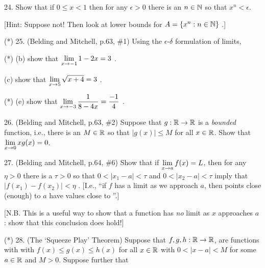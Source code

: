 \documentclass[12pt]{article}
\begin{document}
\begin{description}


\item{24.} Show that if $0\leq x<1$ then for any $\epsilon>0$ there is an $n\in{\mathbb N}$ so that $x^n<\epsilon$. 

\ssk

\item{\spc} [Hint: Suppose not! Then look at lower bounds for $A=\{x^n : n\in{\mathbb N}\}$ .] 

\msk

\item{(*) 25.} (Belding and Mitchell, p.63, \#1) Using the $\epsilon$-$\delta$ formulation of limits,

\item{(*)} (b) show that $\displaystyle\lim_{x\rightarrow -1} 1-2x = 3$ .

\item{\spc} (c) show that $\displaystyle \lim_{x\rightarrow 5} \sqrt{x+4} = 3$ .

\item{(*)} (e) show that $\displaystyle \lim_{x\rightarrow -3} {{1}\over{8-4x}} = {{-1}\over{4}}$ .

\msk

\item{26.} (Belding and Mitchell, p.63, \#2) Suppose that $g:{\mathbb R}\rightarrow{\mathbb R}$ is a {\it bounded}
function, i.e., there is an $M\in{\mathbb R}$ so that $|g(x)|\leq M$ for all $x\in{\mathbb R}$. Show 
that $\displaystyle\lim_{x\rightarrow 0} xg(x) = 0$.

\msk

\item{27.} (Belding and Mitchell, p.64, \#6) Show that if $\displaystyle\lim_{x\rightarrow a} f(x) = L$, then 
for any $\eta>0$ there is a $\tau>0$ so that $0<|x_1-a|<\tau$ and $0<|x_2-a|<\tau$ imply that
$|f(x_1)-f(x_2)|<\eta$ . [I.e., ``if $f$ has a limit as we approach $a$, then points close (enough)
to $a$ have values close to  ''.]

\ssk

\item{\spc} [N.B. This is a useful way to show that a function has {\it no} limit as $x$ approaches $a$ : 
show that this conclusion does  hold!]

\msk

\item{(*) 28.} (The `Squeeze Play' Theorem) Suppose that $f,g,h:{\mathbb R}\rightarrow{\mathbb R}$,
are functions with  with $f(x)\leq g(x)\leq h(x)$ for all $x\in{\mathbb R}$
with $0<|x-a|<M$ for some $a\in{\mathbb R}$ and $M>0$.
Suppose further that 


\end{description}
\end{document}
